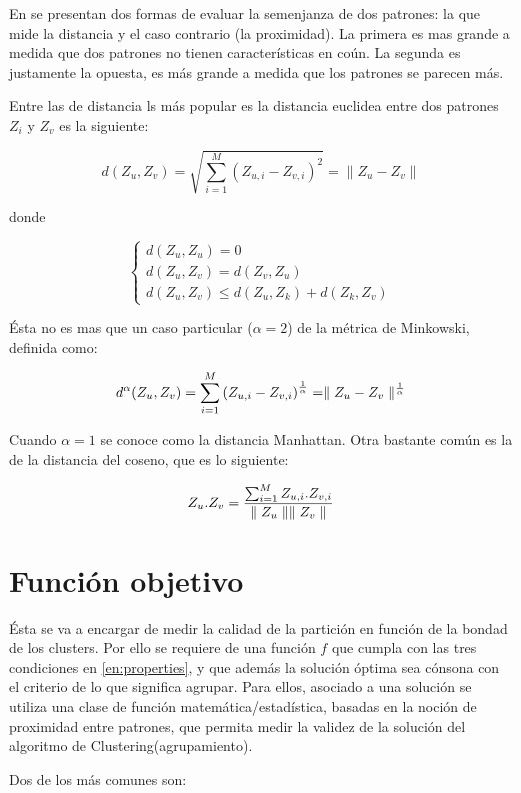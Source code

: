 En  \cite{SwAjAm2009} se presentan dos formas de evaluar la semenjanza de dos patrones: la que mide la distancia y el caso contrario (la
proximidad). La primera es mas grande a medida que dos patrones no tienen caracter\'isticas en co\'un.
La segunda es justamente la opuesta, es m\'as
grande a medida que los patrones se parecen m\'as.

Entre las de distancia ls m\'as popular es la distancia euclidea entre
dos patrones $Z_i$ y $Z_v$ es la siguiente:

\[
d(Z_u,Z_v) = \sqrt {\sum_{i=1}^M {(Z_{u,i} - Z_{v,i})}^2} = \parallel Z_u - Z_v \parallel
\]

donde

\[
  \begin{cases}
    d(Z_u,Z_u) = 0\\
    d(Z_u,Z_v) = d(Z_v,Z_u)\\
    d(Z_u,Z_v) \leq d(Z_u,Z_k) + d(Z_k,Z_v)
  \end{cases}
\]

\'Esta no es mas que un caso particular ($\alpha = 2$) de la m\'etrica de 
Minkowski, definida como:

\[
d^{\alpha}(Z_u,Z_v) = \sum_{i=1}^M {(Z_{u,i} - Z_{v,i})}^{1 \over \alpha} = \parallel Z_u - Z_v \parallel ^ {1 \over \alpha}
\]

Cuando $\alpha = 1$ se conoce como la distancia Manhattan. Otra bastante com\'un es
la de la distancia del coseno, que es lo siguiente:

\[
Z_u . Z_v =  {{\sum_{i=1}^M {Z_{u,i} . Z_{v,i}}}  \over { \parallel Z_u \parallel \parallel Z_v \parallel}}
\]

\section{Funci\'on objetivo} \label{sect:fobjetivo}

\'Esta se va a encargar de medir la calidad de la partici\'on en 
funci\'on de la bondad de los clusters. Por ello se requiere de una funci\'on $f$ que cumpla
con las tres condiciones en \ref{en:properties}, y que adem\'as la soluci\'on
\'optima sea c\'onsona con el criterio de lo que significa agrupar. Para ellos,
asociado a una soluci\'on se utiliza una clase de funci\'on matem\'atica/estad\'istica,
basadas en la noci\'on de proximidad entre patrones, que permita medir la validez
de la soluci\'on del algoritmo de Clustering(agrupamiento).

Dos de los m\'as comunes son:


